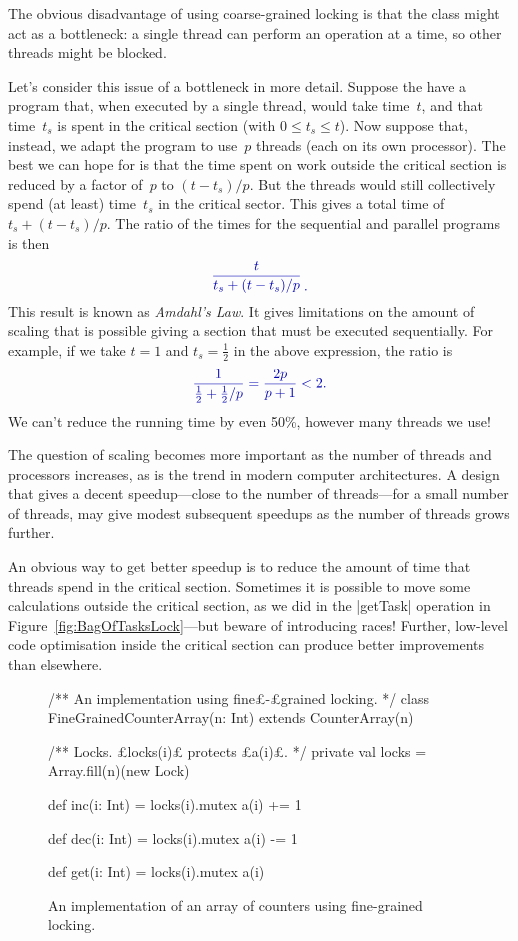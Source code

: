 The obvious disadvantage of using coarse-grained locking is that the class
might act as a bottleneck: a single thread can perform an operation at a time,
so other threads might be blocked.

Let's consider this issue of a bottleneck in more detail.  Suppose the have a
program that, when executed by a single thread, would take time~$t$, and that
time~$t_s$ is spent in the critical section (with $0 \le t_s \le t$).  Now
suppose that, instead, we adapt the program to use~$p$ threads (each on its
own processor).  The best we can hope for is that the time spent on work
outside the critical section is reduced by a factor of~$p$ to $(t-t_s)/p$.
But the threads would still collectively spend (at least) time~$t_s$ in the
critical sector.  This gives a total time of $t_s + (t-t_s)/p$.  The ratio of
the times for the sequential and parallel programs is then
\[\mstyle
\frac{t}{t_s + (t-t_s)/p} \, \raisebox{-1.8ex}{.}
\]
This result is known as \emph{Amdahl's Law}.  It gives
limitations on the amount of scaling that is possible giving a section that
must be executed sequentially.  For example, if we take $t = 1$ and $t_s =
\frac{1}{2}$ in the above expression, the ratio is
\[\mstyle
\frac{1}{\frac{1}{2} + \frac{1}{2}/p} = \frac{2p}{p+1} < 2.
\]
We can't reduce the running time by even 50\%, however many threads we use!

The question of scaling becomes more important as the number of threads and
processors increases, as is the trend in modern computer architectures.  A
design that gives a decent speedup---close to the number of threads---for a
small number of threads, may give modest subsequent speedups as the number of
threads grows further.

An obvious way to get better speedup is to reduce the amount of time that
threads spend in the critical section.  Sometimes it is possible to move some
calculations outside the critical section, as we did in the |getTask|
operation in Figure~\ref{fig:BagOfTasksLock}---but beware of introducing races!
Further, low-level code optimisation inside the critical section can
produce better improvements than elsewhere. 


\begin{figure}
\begin{scala}
/** An implementation using fine£-£grained locking. */
class FineGrainedCounterArray(n: Int) extends CounterArray(n){
  /** Locks.  £locks(i)£ protects £a(i)£. */
  private val locks = Array.fill(n)(new Lock)

  def inc(i: Int) = locks(i).mutex{ a(i) += 1 }

  def dec(i: Int) = locks(i).mutex{ a(i) -= 1 }

  def get(i: Int) = locks(i).mutex{ a(i) }
}
\end{scala}
\caption{An implementation of an array of counters using fine-grained
   locking.}
\label{fig:FineGrainedCounterArray}
\end{figure}


